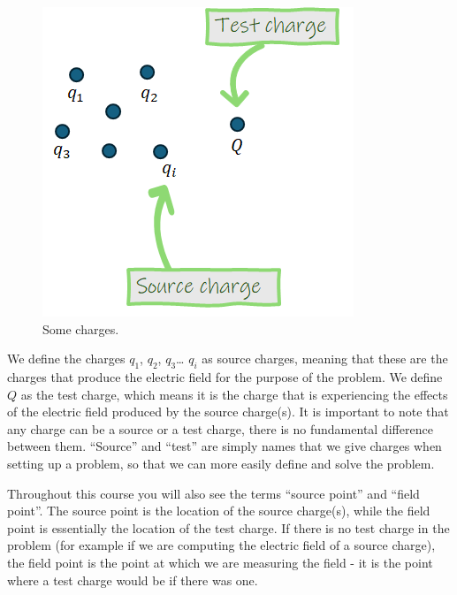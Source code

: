 \documentclass[
  letterpaper,
  DIV=11,
  numbers=noendperiod]{scrreprt}
\begin{document}
\begin{figure}[H]

{\centering \includegraphics{Figures/sourcetest_definitions.png}

}

\caption{Some charges.}

\end{figure}%

We define the charges \(q_1\), \(q_2\), \(q_3\)\ldots{} \(q_i\) as
source charges, meaning that these are the charges that produce the
electric field for the purpose of the problem. We define \(Q\) as the
test charge, which means it is the charge that is experiencing the
effects of the electric field produced by the source charge(s). It is
important to note that any charge can be a source or a test charge,
there is no fundamental difference between them. ``Source'' and ``test''
are simply names that we give charges when setting up a problem, so that
we can more easily define and solve the problem.

Throughout this course you will also see the terms ``source point'' and
``field point''. The source point is the location of the source
charge(s), while the field point is essentially the location of the test
charge. If there is no test charge in the problem (for example if we are
computing the electric field of a source charge), the field point is the
point at which we are measuring the field - it is the point where a test
charge would be if there was one.
\end{document}

